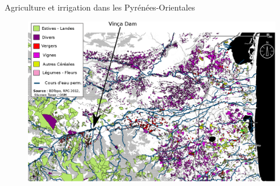 \documentclass[newPxFont]{beamer}
\begin{document}

\begin{frame}[c]{Agriculture et irrigation dans les Pyrénées-Orientales}
\vspace{-3em}
\begin{figure}
	\hspace*{-1.1cm}
	\includegraphics[width = 1.2\textwidth]{img/agriculture_aval_vinca}
\end{figure}


\end{frame}
\end{document}
